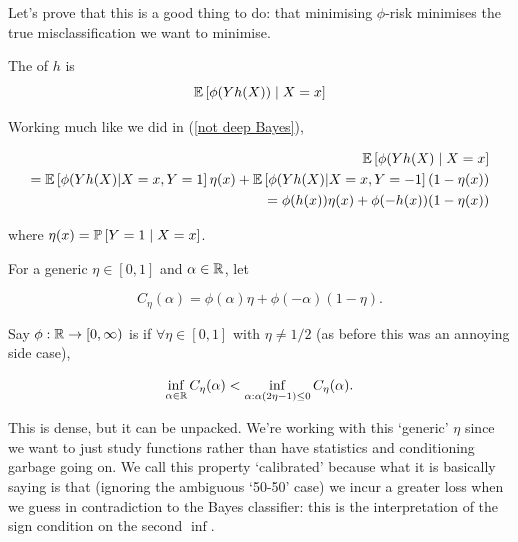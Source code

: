 \documentclass[11pt]{scrartcl}
\begin{document}
Let's prove that this is a good thing to do: that minimising $\phi$-risk minimises the true misclassification we want to minimise.

\begin{definition}
The  of $h$ is 
\begin{equation}
    \E{ \phi(Y h(X)) \mid X=x} 
\end{equation}
\end{definition}

Working much like we did in (\ref{not deep Bayes}),

\begin{align}
    \E{ \phi(Y h(X) \mid X=x} \\
    = \E{\phi(Y h(X) | X=x, Y=1} \eta(x) + \E{\phi(Y h(X) | X=x, Y=-1} (1 - \eta(x)) \\
    = \phi(h(x)) \eta(x) + \phi(-h(x))(1-\eta(x))
\end{align}

where $\eta(x) = \P{Y=1 \mid X=x}$.

For a generic $\eta \in [0,1]$ and $\alpha \in \RR$, let 

\begin{equation}
    C_\eta(\alpha) = \phi(\alpha) \eta + \phi(-\alpha)(1-\eta).
\end{equation}


\begin{definition}
Say $\phi : \RR \rightarrow [0, \infty)$ is  if $\forall \eta \in [0,1]$ with $\eta \neq 1/2$ (as before this was an annoying side case),

\begin{equation}
    \inf_{\alpha \in \RR} C_\eta(\alpha) < \inf_{\alpha : \alpha(2\eta - 1) \le 0} C_\eta (\alpha).
\end{equation}

This is dense, but it can be unpacked. We're working with this `generic' $\eta$ since we want to just study functions rather than have statistics and conditioning garbage going on. We call this property `calibrated' because what it is basically saying is that (ignoring the ambiguous `50-50' case) we incur a greater loss when we guess in contradiction to the Bayes classifier: this is the interpretation of the sign condition on the second $\inf$.
\end{definition}

\end{document}
